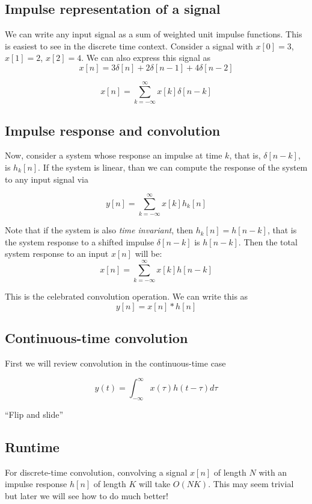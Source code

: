 \subsection{Impulse representation of a signal}
We can write any input signal as a sum of weighted unit impulse
functions. This is easiest to see in the discrete time context. 
Consider a signal with $x[0]=3$, $x[1]=2$, $x[2] = 4$. We can also 
express this signal as 
\[
x[n] = 3\delta[n] + 2\delta[n-1] + 4\delta[n-2]
\]  

\[
x[n] = \sum_{k=-\infty}^\infty x[k]\delta[n-k]
\]

\subsection{Impulse response and convolution}
Now, consider a system whose response an impulse at time $k$, 
that is, $\delta[n-k]$, is $h_k[n]$. If the system is linear,
than we can compute the response of the system to any input signal
via

\[
y[n] = \sum_{k=-\infty}^{\infty} x[k] h_k[n]
\]

Note that if the system is also \textit{time invariant}, then
$h_k[n] = h[n -k]$, that is the system response to a shifted
impulse $\delta[n-k]$ is $h[n-k]$. Then the total system
response to an input $x[n]$ will be: 
\[
x[n] = \sum_{k=-\infty}^\infty x[k] h[n-k]
\]

This is the celebrated convolution operation. We can 
write this as
\[
y[n] = x[n] * h[n]
\]


\subsection{Continuous-time convolution}

First we will review convolution in the continuous-time
case

\[
y(t) = \int_{-\infty}^{\infty} x(\tau) h(t - \tau) d\tau
\]


``Flip and slide'' 

\subsection{Runtime}

For discrete-time convolution, convolving a
signal $x[n]$ of length $N$ with an impulse response
$h[n]$ of length $K$ will take $O(NK)$. This 
may seem trivial but later we will see how to do 
much better! 


